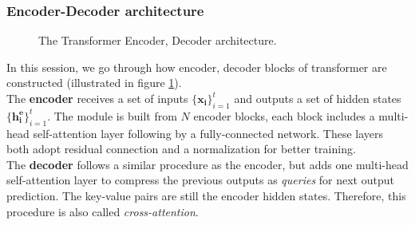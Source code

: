 \subsubsection{Encoder-Decoder architecture}
\begin{figure}[t!]
     \centering
     \hspace{2cm}
     \caption{The Transformer Encoder, Decoder architecture.\cite{vaswani2017attention}}
     \label{fig:trans_enc_dec}
\end{figure}
In this session, we go through how encoder, decoder blocks of transformer are constructed (illustrated in figure \ref{fig:trans_enc_dec}).\\
The \textbf{encoder} receives a set of inputs $\{{\mathbf{x_i}}\}_{i=1}^t$ and outputs a set of hidden states $\{{\mathbf{h_i^{e}}}\}_{i=1}^t$. The module is built from $N$ encoder blocks, each block includes a multi-head self-attention layer following by a fully-connected network. These layers both adopt residual connection and a normalization for better training. \\
The \textbf{decoder} follows a similar procedure as the encoder, but adds one multi-head self-attention layer to compress the previous outputs as \textit{queries} for next output prediction. The key-value pairs are still the encoder hidden states. Therefore, this procedure is also called \textit{cross-attention}.  

